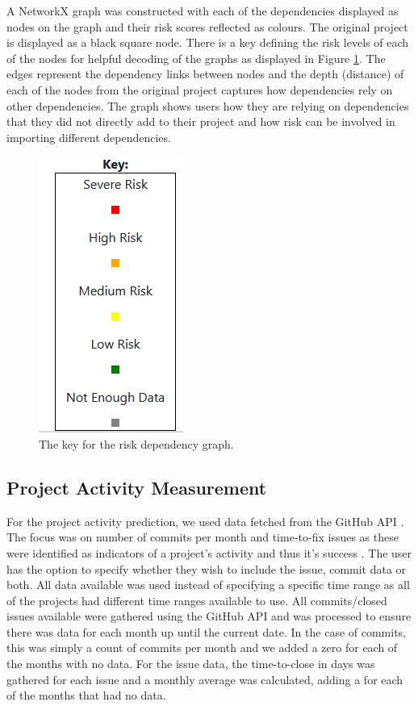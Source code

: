 \documentclass[conference]{IEEEtran}
\begin{document}
A NetworkX graph was constructed with each of the dependencies displayed as nodes on the graph and their risk scores reflected as colours. The original project is displayed as a black square node. There is a key defining the risk levels of each of the nodes for helpful decoding of the graphs as displayed in Figure \ref{fig:key}. The edges represent the dependency links between nodes and the depth (distance) of each of the nodes from the original project captures how dependencies rely on other dependencies. The graph shows users how they are relying on dependencies that they did not directly add to their project and how risk can be involved in importing different dependencies. 

\begin{figure}
\begin{center}
    \includegraphics[scale=0.5]{Key.png}
    \caption{The key for the risk dependency graph.}
    \label{fig:key}
\end{center}
\end{figure}

\subsection{Project Activity Measurement}
For the project activity prediction, we used data fetched from the GitHub API \cite{noauthor_github_nodate}. The focus was on number of commits per month and time-to-fix issues as these were identified as indicators of a project's activity and thus it's success \cite{sen_open_2012, chahal_fuzzy_2016}. The user has the option to specify whether they wish to include the issue, commit data or both. All data available was used instead of specifying a specific time range as all of the projects had different time ranges available to use. All commits/closed issues available were gathered using the GitHub API and was processed to ensure there was data for each month up until the current date. In the case of commits, this was simply a count of commits per month and we added a zero for each of the months with no data. For the issue data, the time-to-close in days was gathered for each issue and a monthly average was calculated, adding a  for each of the months that had no data. 
\end{document}

